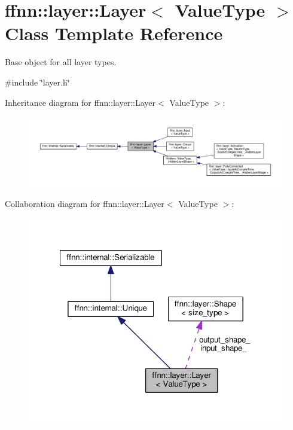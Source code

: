 \hypertarget{classffnn_1_1layer_1_1_layer}{\section{ffnn\-:\-:layer\-:\-:Layer$<$ Value\-Type $>$ Class Template Reference}
\label{classffnn_1_1layer_1_1_layer}
}


Base object for all layer types.  




{\ttfamily \#include \char`\"{}layer.\-h\char`\"{}}



Inheritance diagram for ffnn\-:\-:layer\-:\-:Layer$<$ Value\-Type $>$\-:\nopagebreak
\begin{figure}[H]
\begin{center}
\leavevmode
\includegraphics[width=350pt]{classffnn_1_1layer_1_1_layer__inherit__graph}
\end{center}
\end{figure}


Collaboration diagram for ffnn\-:\-:layer\-:\-:Layer$<$ Value\-Type $>$\-:\nopagebreak
\begin{figure}[H]
\begin{center}
\leavevmode
\includegraphics[width=318pt]{classffnn_1_1layer_1_1_layer__coll__graph}
\end{center}
\end{figure}
